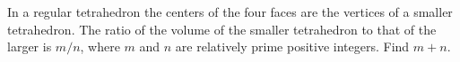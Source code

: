 In a regular tetrahedron the centers of the four faces are the vertices of a smaller tetrahedron. The ratio of the volume of the smaller tetrahedron to that of the larger is $m/n$, where $m$ and $n$ are relatively prime positive integers. Find $m+n.$